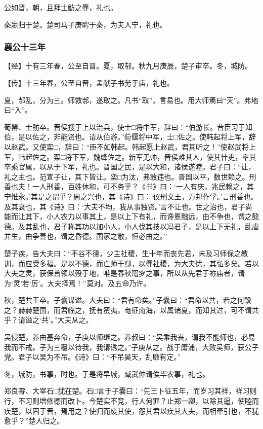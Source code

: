 \documentclass[]{article}
\begin{document}
公如晋，朝，且拜士鲂之辱，礼也。

秦嬴归于楚。楚司马子庚聘于秦，为夫人宁，礼也。

\hypertarget{header-n1976}{%
\subsubsection{襄公十三年}\label{header-n1976}}

【经】十有三年春，公至自晋。夏，取邿。秋九月庚辰，楚子审卒。冬，城防。

【传】十三年春，公至自晋，孟献子书劳于庙，礼也。

夏，邿乱，分为三。师救邿，遂取之。凡书``取''，言易也。用大师焉曰``灭''。弗地曰``入''。

荀罃、士鲂卒。晋侯搜于上以治兵，使士□将中军，辞曰：``伯游长。昔臣习于知伯，是以佐之，非能贤也。请从伯游。''荀偃将中军，士□佐之。使韩起将上军，辞以赵武。又使栾□，辞曰：``臣不如韩起。韩起愿上赵武，君其听之！''使赵武将上军，韩起佐之。栾□将下军，魏绛佐之。新军无帅，晋侯难其人，使其什吏，率其卒乘官属，以从于下军，礼也。晋国之民，是以大和，诸侯遂睦。君子曰：``让，礼之主也。范宣子让，其下皆让。栾□为汰，弗敢违也。晋国以平，数世赖之。刑善也夫！一人刑善，百姓休和，可不务乎？《书》曰：`一人有庆，兆民赖之，其宁惟永。'其是之谓乎？周之兴也，其《诗》曰：`仪刑文王，万邦作孚。'言刑善也。及其衰也，其《诗》曰：`大夫不均，我从事独贤。'言不让也。世之治也，君子尚能而让其下，小人农力以事其上，是以上下有礼，而谗慝黜远，由不争也，谓之懿德。及其乱也，君子称其功以加小人，小人伐其技以冯君子，是以上下无礼，乱虐并生，由争善也，谓之昏德。国家之敝，恒必由之。''

楚子疾，告大夫曰：``不谷不德，少主社稷，生十年而丧先君，未及习师保之教训，而应受多福。是以不德，而亡师于鄢，以辱社稷，为大夫忧，其弘多矣。若以大夫之灵，获保首领以殁于地，唯是春秋窀穸之事，所以从先君于祢庙者，请为`灵'若`厉'。大夫择焉！''莫对。及五命乃许。

秋，楚共王卒。子囊谋谥。大夫曰：``君有命矣。''子囊曰：``君命以共，若之何毁之？赫赫楚国，而君临之，抚有蛮夷，奄征南海，以属诸夏，而知其过，可不谓共乎？请谥之`共'。''大夫从之。

吴侵楚，养由基奔命，子庚以师继之。养叔曰：``吴乘我丧，谓我不能师也，必易我而不戒。子为三覆以待我，我请诱之。''子庚从之。战于庸浦，大败吴师，获公子党。君子以吴为不吊。《诗》曰：``不吊昊天，乱靡有定。''

冬，城防，书事，时也。于是将早城，臧武仲请俟毕农事，礼也。

郑良霄、大宰石□犹在楚。石□言于子囊曰：``先王卜征五年，而岁习其祥，祥习则行，不习则增修德而改卜。今楚实不竞，行人何罪？止郑一卿，以除其逼，使睦而疾楚，以固于晋，焉用之？使归而废其使，怨其君以疾其大夫，而相牵引也，不犹愈乎？''楚人归之。
\end{document}
